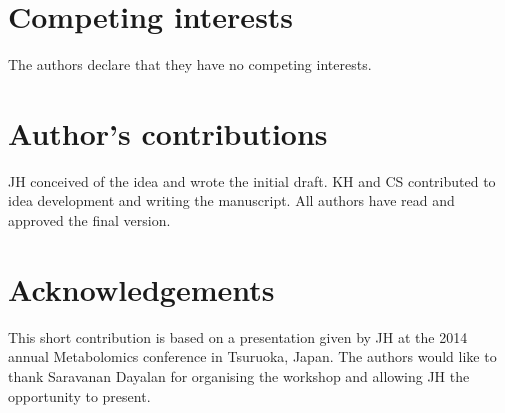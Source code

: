 \documentclass{bmcart}
\begin{document}
\begin{backmatter}

\section*{Competing interests}
  The authors declare that they have no competing interests.

\section*{Author's contributions}
    JH conceived of the idea and wrote the initial draft. KH and CS contributed to idea development and writing the manuscript. All authors have read and approved the final version. 

\section*{Acknowledgements}
  This short contribution is based on a presentation given by JH at the 2014 annual Metabolomics conference in Tsuruoka, Japan. The authors would like to thank Saravanan Dayalan for organising the workshop and allowing JH the opportunity to present. 




\end{backmatter}
\end{document}
